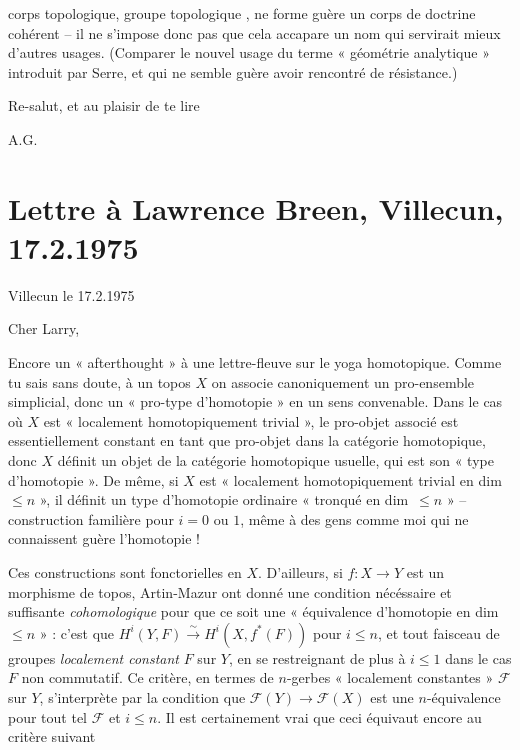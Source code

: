 \documentclass[11pt,a4paper]{article}
\begin{document}
corps topologique, groupe topologique ,  ne forme guère un corps de doctrine cohérent -- il ne s'impose donc pas que cela accapare un nom qui servirait mieux d'autres usages. (Comparer le nouvel usage du terme « géométrie analytique » introduit par Serre, et qui ne semble guère avoir rencontré de résistance.)

Re-salut, et au plaisir de te lire

A.G.

\section{Lettre à Lawrence Breen, Villecun, 17.2.1975}


Villecun le 17.2.1975

Cher Larry,

Encore un « afterthought » à une lettre-fleuve sur le yoga homotopique. Comme tu sais sans doute, à un topos $X$ on associe canoniquement un pro-ensemble simplicial, donc un « pro-type d'homotopie » en un sens convenable. Dans le cas où $X$ est « localement homotopiquement trivial », le pro-objet associé est essentiellement constant en tant que pro-objet dans la catégorie homotopique, donc $X$ définit un objet de la catégorie homotopique usuelle, qui est son « type d'homotopie ». De même, si $X$ est « localement homotopiquement trivial en dim~$\leqslant n$ », il définit un type d'homotopie ordinaire « tronqué en dim~$\leqslant n$ » -- construction familière pour $i = 0$ ou $1$, même à des gens comme moi qui ne connaissent guère l'homotopie !

Ces constructions sont fonctorielles en $X$. D'ailleurs, si $f\colon X \to Y$ est un morphisme de topos, Artin-Mazur ont donné une condition nécéssaire et suffisante \emph{cohomologique} pour que ce soit une « équivalence d'homotopie en dim~$\leqslant n$ » : c'est que $H^i(Y, F) \xrightarrow{\sim} H^i(X, f^*(F))$ pour $i \leqslant n$, et tout faisceau de groupes \emph{localement constant} $F$ sur $Y$, en se restreignant de plus à $i \leqslant 1$ dans le cas $F$ non commutatif. Ce critère, en termes de $n$-gerbes « localement constantes » $\mathcal{F}$ sur $Y$, s'interprète par la condition que $\mathcal{F}(Y) \to \mathcal{F}(X)$ est une $n$-équivalence pour tout tel $\mathcal{F}$ et $i \leqslant n$. Il est certainement vrai que ceci équivaut encore au critère suivant
\end{document}
